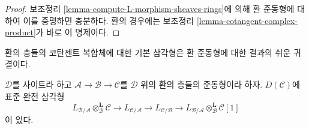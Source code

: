 \begin{proof}
보조정리 \ref{lemma-compute-L-morphism-sheaves-rings}에 의해 환 준동형에
대하여 이를 증명하면 충분하다. 환의 경우에는 보조정리
\ref{lemma-cotangent-complex-product}가 바로 이 명제이다.
\end{proof}

\noindent
환의 층들의 코탄젠트 복합체에 대한 기본 삼각형은 환 준동형에 대한 결과의
쉬운 귀결이다.

\begin{lemma}
\label{lemma-triangle-sheaves-rings}
$\mathcal{D}$를 사이트라 하고
$\mathcal{A} \to \mathcal{B} \to \mathcal{C}$를 $\mathcal{D}$ 위의 환의
층들의 준동형이라 하자. $D(\mathcal{C})$에 표준 완전 삼각형
$$
L_{\mathcal{B}/\mathcal{A}} \otimes_\mathcal{B}^\mathbf{L} \mathcal{C}
\to L_{\mathcal{C}/\mathcal{A}} \to L_{\mathcal{C}/\mathcal{B}} \to
L_{\mathcal{B}/\mathcal{A}} \otimes_\mathcal{B}^\mathbf{L} \mathcal{C}[1]
$$
이 있다.
\end{lemma}


